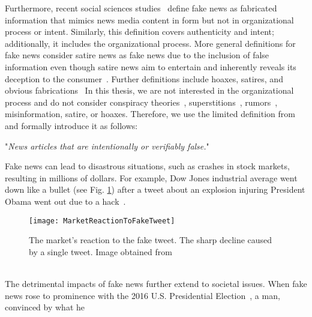 Furthermore, recent social sciences studies~\parencite{TheScienceOfFakeNews_Lazer, ThePsycologyOfFakeNews_Pennycook} define fake news as fabricated information that mimics news media content in form but not in organizational process or intent. Similarly, this definition covers authenticity and intent; additionally, it includes the organizational process. More general definitions for fake news consider satire news as fake news due to the inclusion of false information even though satire news aim to entertain and inherently reveals its deception to the consumer~\parencite{WhenFakeNewsBecomesReal_Balmas, TheImpactOfRealNewsAboutFakeNews_Brewer, NewsVerificationByExploitingConflictingSocialViewpoints_Jin, FakeNewsOrTruthUsingSatiricalCues_Rubin}. Further definitions include hoaxes, satires, and obvious
fabrications~\parencite{DeceptionDetectionForFakeNews3TypesOfFakeNews_Rubin}
In this thesis, we are not interested in the organizational process and do not consider conspiracy theories~\parencite{ConspiracyTheories_Sunstein}, superstitions~\parencite{Superstition_Lindeman}, rumors~\parencite{RumorsAndHealthCareReform_Berinsky}, misinformation, satire, or hoaxes. Therefore, we use the limited definition from~\parencite{SocialMediaAndFakeNewsIn2016Election_Allcott} and formally introduce it as follows:
\begin{definition}
    "\emph{News articles that are intentionally or verifiably false.}"~\parencite{SocialMediaAndFakeNewsIn2016Election_Allcott}
\end{definition}
Fake news can lead to disastrous situations, such as crashes in stock markets, resulting in millions of dollars. For example, Dow Jones
industrial average went down like a bullet (see Fig. \ref{fig:MarketReactionToFakeTweet}) after a tweet about an explosion injuring President Obama
went out due to a hack~\parencite{MarketQuaversAfterFakeAPTweet_ElBoghdady}.
\begin{figure}
    \centering
    \texttt{[image: MarketReactionToFakeTweet]}
    \caption[Market Reaction to Fake Tweet]{The market's reaction to the fake tweet. The sharp decline caused by a single tweet. Image obtained from~\parencite{MarketQuaversAfterFakeAPTweet_ElBoghdady}}\label{fig:MarketReactionToFakeTweet}
\end{figure}\\
The detrimental impacts of fake news further extend to societal issues.
When fake news rose to prominence with the 2016 U.S. Presidential Election~\parencite{USPresidentialElection2016}, a man, convinced by what he
